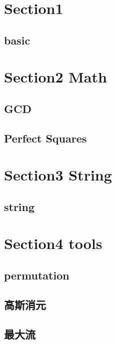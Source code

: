 \section{Section1}
    \subsection{basic}
        
        
\section{Section2 Math}
    \subsection{GCD}
        
    \subsection{Perfect Squares}
        

\section{Section3 String}
    \subsection{string}
        

\section{Section4 tools}
    \subsection{permutation}
        
    \subsection{高斯消元}
        
    \subsection{最大流}
        


